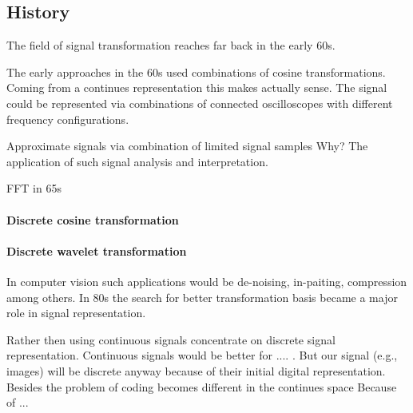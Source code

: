 \subsection{History}
\label{sec:history}
The field of signal transformation reaches far back in the early 60s.
\cite{Rubinstein2010}

The early approaches in the 60s used combinations of cosine transformations. 
Coming from a continues representation this makes actually sense. The signal
could be represented via combinations of connected oscilloscopes with different
frequency configurations. 

Approximate signals via combination of limited signal samples Why? The
application of such signal analysis and interpretation.


FFT in 65s



\paragraph{Discrete cosine transformation}
\Todo{}

\paragraph{Discrete wavelet transformation}
\Todo{}

In computer vision such applications would be de-noising, in-paiting,
compression among others. In 80s the search for better transformation basis
became a major role in signal representation.\cite{}

Rather then using continuous signals concentrate on discrete
signal representation. Continuous signals would be better for .... .  But our
signal (e.g., images) will be discrete anyway because of their initial digital
representation. Besides the problem of coding becomes different in the continues
space \cite{} Because of ...

